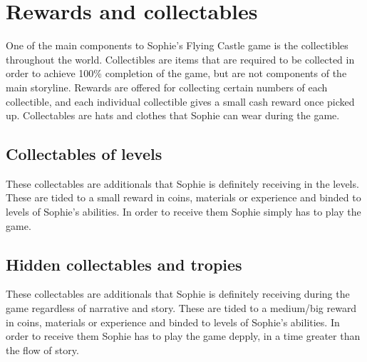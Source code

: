 \section{Rewards and collectables}
One of the main components to Sophie's Flying Castle game is the collectibles throughout the world.
Collectibles are items that are required to be collected in order to achieve 100\%
completion of the game, but are not components of the main storyline. Rewards are offered for collecting certain numbers of each
collectible, and each individual collectible gives a small cash reward once picked up. Collectables are hats and clothes that Sophie
can wear during the game. 

\subsection{Collectables of levels}
These collectables are additionals that Sophie is definitely receiving in the levels. These are tided to a small reward in coins, materials or experience and binded to levels of Sophie's abilities. In order to receive them Sophie simply has to play the game. 


\subsection{Hidden collectables and tropies}
These collectables are additionals that Sophie is definitely receiving during the game regardless of narrative and story. These are tided to a medium/big reward in coins, materials or experience and binded to levels of Sophie's abilities. In order to receive them Sophie has to play the game depply, in a time greater than the flow of story. 

